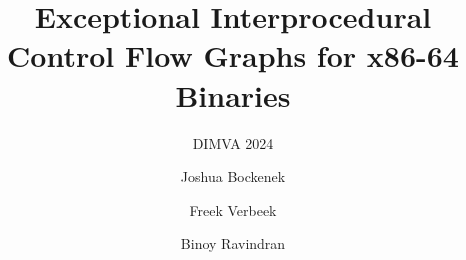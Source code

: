 \title[EICFGs for x86-64 Binaries]{Exceptional Interprocedural Control Flow Graphs
for x86-64 Binaries}
\subtitle{DIMVA 2024}
\author[J.\ Bockenek et al.]{Joshua Bockenek \and Freek Verbeek \and Binoy Ravindran}
\subject{Static Binary Analysis}
\date{}
